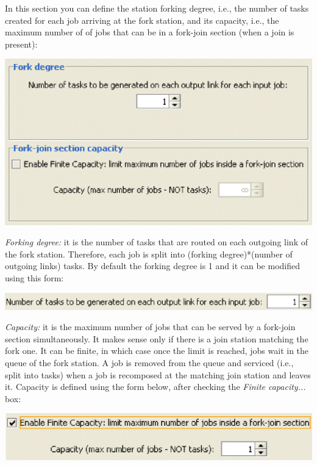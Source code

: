 In this section you can define the station forking degree, i.e., the number of tasks created for each job arriving at the fork station, and its capacity, i.e., the maximum number of of jobs that can be in a fork-join section (when a join is present):\\
\begin{center}
\includegraphics[scale=.5]{img/jsim/fork1.eps}
\end{center}
\emph{Forking degree:} it is the number of tasks that are routed on each outgoing link of the fork station. Therefore, each job is split into (forking degree)*(number of outgoing links) tasks. By default the forking degree is 1 and it can be modified using this form:\\
\begin{center}
\includegraphics[scale=.5]{img/jsim/tasks.eps}
\end{center}
\emph{Capacity:} it is the maximum number of jobs that can be served by a fork-join
section simultaneously. It makes sense only if there is a join station matching the fork one. It can be finite, in which case once the limit is reached, jobs wait in the queue of the fork station. A job is removed from the queue and serviced (i.e., split into tasks) when a job is recomposed at the matching join station and leaves it. Capacity is defined using the form below, after checking the \emph{Finite capacity...} box:\\
\begin{center}
\includegraphics[scale=.5]{img/jsim/blocking.eps}
\end{center}

